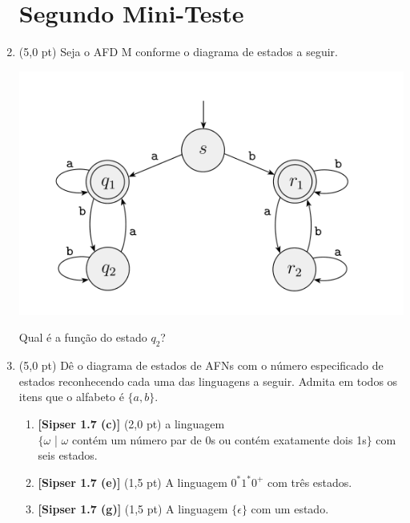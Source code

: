\documentclass[12pt,a4paper,oneside]{article}
\begin{document}
\begin{enumerate}
	
	\section*{Segundo Mini-Teste}
	
	\item (5,0 pt) Seja o AFD M conforme o diagrama de estados a seguir.
	\begin{center}
		\includegraphics[width=.7\textwidth]{images/afd-m4}
	\end{center}
	Qual é a função do estado $q_2$?
	
	\vspace*{2cm}
	\item (5,0 pt) Dê o diagrama de estados de AFNs com o número especificado de estados reconhecendo cada uma das linguagens a seguir. Admita em todos os itens que o alfabeto é  $\{a,b\}$.
		\begin{enumerate}
			\item {\bf [Sipser 1.7 (c)]} (2,0 pt) a linguagem \\$\{\omega$ | $\omega$ contém um número par de 0s ou contém exatamente dois 1s$\}$ com seis estados.
			\item {\bf [Sipser 1.7 (e)]} (1,5 pt) A linguagem $0^*1^*0^+$ com três estados.
			\item {\bf [Sipser 1.7 (g)]} (1,5 pt) A linguagem $\{ \epsilon \}$ com um estado.
		\end{enumerate}

\end{enumerate}
\end{document}
